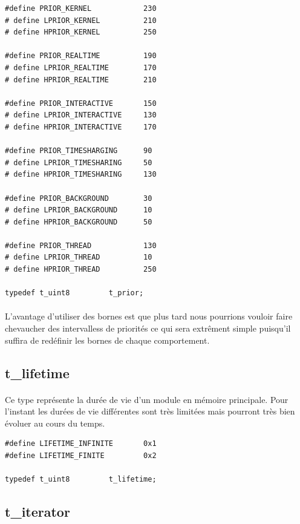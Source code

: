 \documentclass[10pt,a4wide]{article}
\begin{document}
\begin{verbatim}
#define PRIOR_KERNEL            230
# define LPRIOR_KERNEL          210
# define HPRIOR_KERNEL          250

#define PRIOR_REALTIME          190
# define LPRIOR_REALTIME        170
# define HPRIOR_REALTIME        210

#define PRIOR_INTERACTIVE       150
# define LPRIOR_INTERACTIVE     130
# define HPRIOR_INTERACTIVE     170

#define PRIOR_TIMESHARGING      90
# define LPRIOR_TIMESHARING     50
# define HPRIOR_TIMESHARING     130

#define PRIOR_BACKGROUND        30
# define LPRIOR_BACKGROUND      10
# define HPRIOR_BACKGROUND      50

#define PRIOR_THREAD            130
# define LPRIOR_THREAD          10
# define HPRIOR_THREAD          250

typedef t_uint8         t_prior;
\end{verbatim}

\paragraph{}

L'avantage d'utiliser des bornes est que plus tard nous pourrions vouloir
faire chevaucher des intervalless de priorit\'es ce qui sera extr\^ement simple
puisqu'il suffira de red\'efinir les bornes de chaque comportement.

\subsection{t\_lifetime}

\paragraph{}

Ce type repr\'esente la dur\'ee de vie d'un module en m\'emoire principale.
Pour l'instant les dur\'ees de vie diff\'erentes sont tr\`es limit\'ees mais
pourront tr\`es bien \'evoluer au cours du temps.

\begin{verbatim}
#define LIFETIME_INFINITE       0x1
#define LIFETIME_FINITE         0x2

typedef t_uint8         t_lifetime;
\end{verbatim}

\subsection{t\_iterator}
\end{document}
